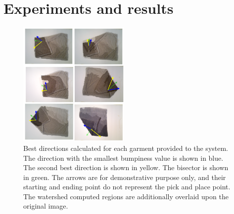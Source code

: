 \chapter{Experiments and results}
\label{experiments_and_results}




\begin{figure}[thpb]
    \centering
    \includegraphics[width=0.48\textwidth]{figures/directions_several.png}
    \caption{Best directions calculated for each garment provided to the system. The direction with the smallest bumpiness value is shown in blue. The second best direction is shown in yellow. The bisector is shown in green. The arrows are for demonstrative purpose only, and their starting and ending point do not represent the pick and place point. The watershed computed regions are additionally overlaid upon the original image.}
    \label{directions_several}
\end{figure}
